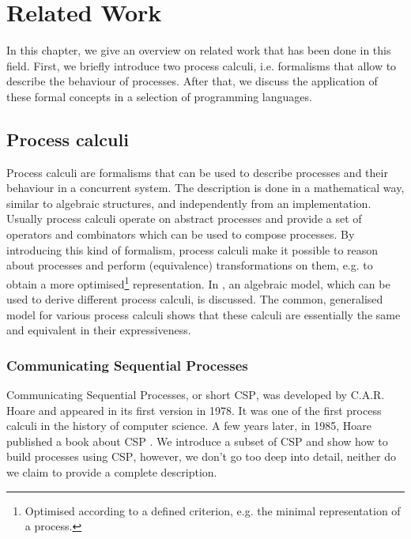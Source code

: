 \chapter{Related Work}
In this chapter, we give an overview on related work that has been done in this field. First, we briefly introduce two process calculi, i.e. formalisms that allow to describe the behaviour of processes. After that, we discuss the application of these formal concepts in a selection of programming languages.

\section{Process calculi}
\label{chp:process_calculi}
Process calculi are formalisms that can be used to describe processes and their behaviour in a concurrent system. The description is done in a mathematical way, similar to algebraic structures, and independently from an implementation. Usually process calculi operate on abstract processes and provide a set of operators and combinators which can be used to compose processes. By introducing this kind of formalism, process calculi make it possible to reason about processes and perform (equivalence) transformations on them, e.g. to obtain a more optimised\footnote{Optimised according to a defined criterion, e.g. the minimal representation of a process.} representation. In \cite{Hoare:2012:LPU:2368298.2368301}, an algebraic model, which can be used to derive different process calculi, is discussed. The common, generalised model for various process calculi shows that these calculi are essentially the same and equivalent in their expressiveness.


\subsection{Communicating Sequential Processes}
Communicating Sequential Processes, or short \textsc{CSP}, was developed by C.A.R. Hoare and appeared in its first version in 1978. It was one of the first process calculi in the history of computer science. A few years later, in 1985, Hoare published a book about \textsc{CSP} \cite{Hoare:1985:CSP:3921}. We introduce a subset of \textsc{CSP} and show how to build processes using \textsc{CSP}, however, we don't go too deep into detail, neither do we claim to provide a complete description.

